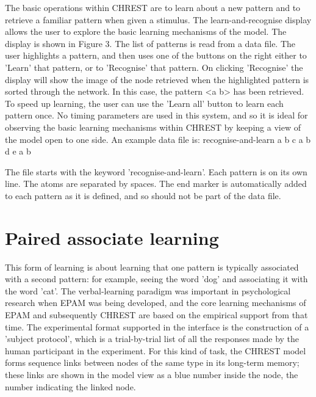 \documentclass{article}
\begin{document}
The basic operations within CHREST are to learn about a new pattern and to retrieve a familiar pattern when given a stimulus.  The learn-and-recognise display allows the user to explore the basic learning mechanisms of the model.  The display is shown in Figure 3.  The list of patterns is read from a data file.  The user highlights a pattern, and then uses one of the buttons on the right either to 'Learn' that pattern, or to 'Recognise' that pattern.  On clicking 'Recognise' the display will show the image of the node retrieved when the highlighted pattern is sorted through the network.  In this case, the pattern <a b> has been retrieved.  To speed up learning, the user can use the 'Learn all' button to learn each pattern once.  
No timing parameters are used in this system, and so it is ideal for observing the basic learning mechanisms within CHREST by keeping a view of the model open to one side. 
An example data file is:
recognise-and-learn 
a b c 
a b 
d e a b

The file starts with the keyword 'recognise-and-learn'.  Each pattern is on its own line.  The atoms are separated by spaces.  The end marker is automatically added to each pattern as it is defined, and so should not be part of the data file.

\section{Paired associate learning}

This form of learning is about learning that one pattern is typically associated with a second pattern: for example, seeing the word 'dog' and associating it with the word 'cat'.  The verbal-learning paradigm was important in psychological research when EPAM was being developed, and the core learning mechanisms of EPAM and subsequently CHREST are based on the empirical support from that time.  The experimental format supported in the interface is the construction of a 'subject protocol', which is a trial-by-trial list of all the responses made by the human participant in the experiment.  For this kind of task, the CHREST model forms sequence links between nodes of the same type in its long-term memory; these links are shown in the model view as a blue number inside the node, the number indicating the linked node.
\end{document}
